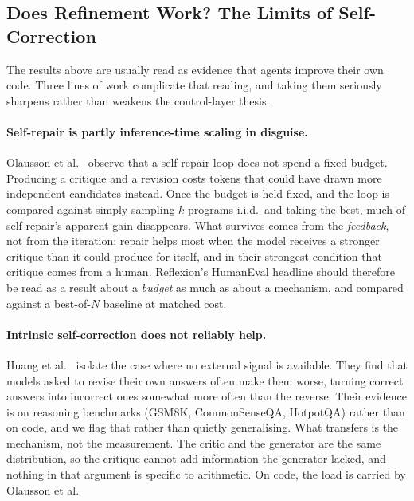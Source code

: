 \documentclass[
  english,        %
  font=times,     %
  twocolumn,      %
]{tumarticle}
\begin{document}
\subsection{Does Refinement Work? The Limits of Self-Correction}
\label{sec:refinement-limits}

The results above are usually read as evidence that agents improve their own code.
Three lines of work complicate that reading, and taking them seriously sharpens
rather than weakens the control-layer thesis.

\paragraph{Self-repair is partly inference-time scaling in disguise.}
Olausson et al.~\cite{olausson2024selfrepair} observe that a self-repair loop does
not spend a fixed budget. Producing a critique and a revision costs tokens that
could have drawn more independent candidates instead. Once the budget is held
fixed, and the loop is compared against simply sampling $k$ programs i.i.d.\ and
taking the best, much of self-repair's apparent gain disappears. What survives
comes from the \emph{feedback}, not from the iteration: repair helps most when the
model receives a stronger critique than it could produce for itself, and in their
strongest condition that critique comes from a human. Reflexion's HumanEval
headline should therefore be read as a result about a \emph{budget} as much as
about a mechanism, and compared against a best-of-$N$ baseline at matched cost.

\paragraph{Intrinsic self-correction does not reliably help.}
Huang et al.~\cite{huang2024selfcorrect} isolate the case where no external signal
is available. They find that models asked to revise their own answers often make
them worse, turning correct answers into incorrect ones somewhat more often than
the reverse. Their evidence is on reasoning benchmarks (GSM8K, CommonSenseQA,
HotpotQA) rather than on code, and we flag that rather than quietly generalising.
What transfers is the mechanism, not the measurement. The critic and the generator
are the same distribution, so the critique cannot add information the generator
lacked, and nothing in that argument is specific to arithmetic. On code, the load
is carried by Olausson et al.
\end{document}
